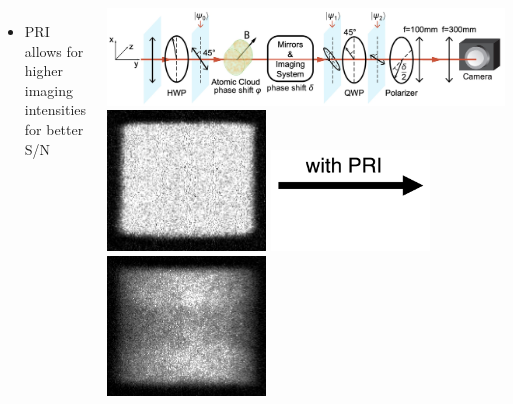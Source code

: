\documentclass[26pt, paperwidth=36in,paperheight=48in]{tikzposter} %
\begin{document}
\begin{columns}
{\begin{minipage}{0.28\textwidth}
\begin{minipage}{0.75\textwidth}
\begin{itemize}
				\item PRI allows for higher imaging intensities for better S/N
			\end{itemize}
		\end{minipage}
	\end{minipage}
	\begin{minipage}{0.2\textwidth}
		\hspace{-7.4cm}
		\vspace{1.3cm}
		\includegraphics[width=1.75\textwidth]{figures_retreat/polrot_setup.png}\\
		\vspace{1.0cm}
		\hspace{-4.5cm}
		\includegraphics[width=0.4\textwidth]{figures_retreat/box_abs_sound_A.png}
		\includegraphics[width=0.4\textwidth]{figures_retreat/with_PRI.png}
		\includegraphics[width=0.4\textwidth]{figures_retreat/pr_sound_A.png}
	\end{minipage}	
	\vspace{-0.07cm}
	
}

	
	


\end{columns}
\end{document}
